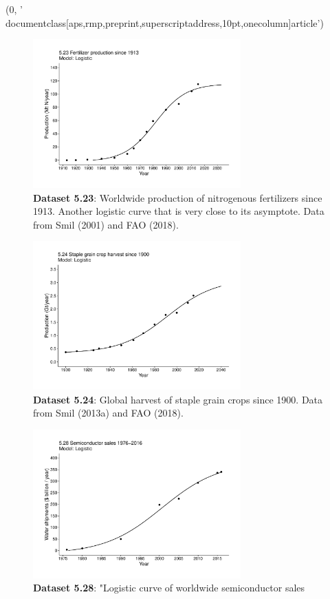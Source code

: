 (0, '\\documentclass[aps,rmp,preprint,superscriptaddress,10pt,onecolumn]{article}\n')
\begin{document}
\begin{figure}[h]
\includegraphics[width=8cm]{output/figs-ggplot/5.23.pdf}
\caption{\textbf{Dataset 5.23}: Worldwide production of nitrogenous fertilizers since 1913. Another logistic curve that is very close to its asymptote. Data from Smil (2001) and FAO (2018).}
\end{figure}
	
\begin{figure}[h]
\includegraphics[width=8cm]{output/figs-ggplot/5.24.pdf}
\caption{\textbf{Dataset 5.24}: Global harvest of staple grain crops since 1900. Data from Smil (2013a) and FAO (2018).}
\end{figure}
	
\begin{figure}[h]
\includegraphics[width=8cm]{output/figs-ggplot/5.28.pdf}
\caption{\textbf{Dataset 5.28}: "Logistic curve of worldwide semiconductor sales}
\end{figure}
	
\end{document}
